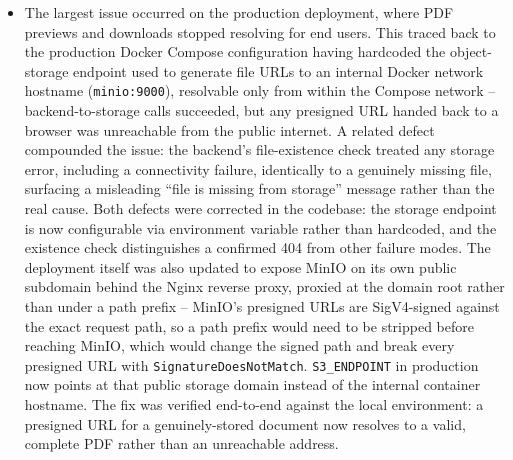 \documentclass[12pt]{article}
\begin{document}
\begin{itemize}[leftmargin=1.4em]
\item The largest issue occurred on the production deployment, where PDF previews and downloads stopped resolving for end users. This traced back to the production Docker Compose configuration having hardcoded the object-storage endpoint used to generate file URLs to an internal Docker network hostname (\texttt{minio:9000}), resolvable only from within the Compose network -- backend-to-storage calls succeeded, but any presigned URL handed back to a browser was unreachable from the public internet. A related defect compounded the issue: the backend's file-existence check treated any storage error, including a connectivity failure, identically to a genuinely missing file, surfacing a misleading ``file is missing from storage'' message rather than the real cause. Both defects were corrected in the codebase: the storage endpoint is now configurable via environment variable rather than hardcoded, and the existence check distinguishes a confirmed 404 from other failure modes. The deployment itself was also updated to expose MinIO on its own public subdomain behind the Nginx reverse proxy, proxied at the domain root rather than under a path prefix -- MinIO's presigned URLs are SigV4-signed against the exact request path, so a path prefix would need to be stripped before reaching MinIO, which would change the signed path and break every presigned URL with \texttt{SignatureDoesNotMatch}. \texttt{S3\_ENDPOINT} in production now points at that public storage domain instead of the internal container hostname. The fix was verified end-to-end against the local environment: a presigned URL for a genuinely-stored document now resolves to a valid, complete PDF rather than an unreachable address.
\end{itemize}
\end{document}
